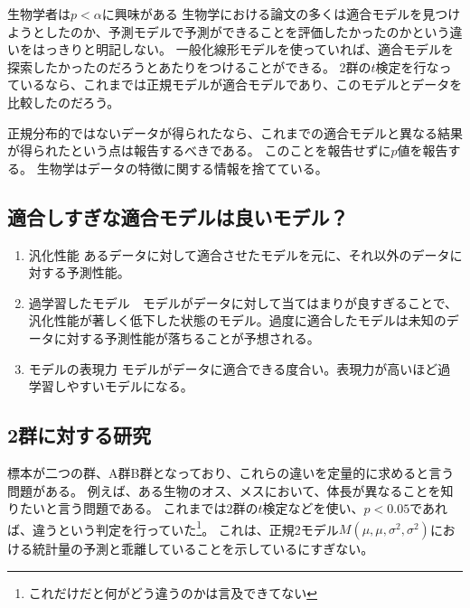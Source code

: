 \begin{SMbox}{生物学者は$p<\alpha$に興味がある}
    生物学における論文の多くは適合モデルを見つけようとしたのか、予測モデルで予測ができることを評価したかったのかという違いをはっきりと明記しない。
    一般化線形モデルを使っていれば、適合モデルを探索したかったのだろうとあたりをつけることができる。
    2群の$t$検定を行なっているなら、これまでは正規モデルが適合モデルであり、このモデルとデータを比較したのだろう。

    
    正規分布的ではないデータが得られたなら、これまでの適合モデルと異なる結果が得られたという点は報告するべきである。
    このことを報告せずに$p$値を報告する。
    生物学はデータの特徴に関する情報を捨てている。
\end{SMbox}

\subsection{適合しすぎな適合モデルは良いモデル？}%

\begin{enumerate}
    \item 汎化性能 あるデータに対して適合させたモデルを元に、それ以外のデータに対する予測性能。
    \item 過学習したモデル　モデルがデータに対して当てはまりが良すぎることで、汎化性能が著しく低下した状態のモデル。過度に適合したモデルは未知のデータに対する予測性能が落ちることが予想される。
    \item モデルの表現力 モデルがデータに適合できる度合い。表現力が高いほど過学習しやすいモデルになる。
\end{enumerate}




\subsection{2群に対する研究}
標本が二つの群、A群B群となっており、これらの違いを定量的に求めると言う問題がある。
例えば、ある生物のオス、メスにおいて、体長が異なることを知りたいと言う問題である。
これまでは2群の$t$検定などを使い、$p<0.05$であれば、違うという判定を行っていた\footnote{これだけだと何がどう違うのかは言及できてない}。
これは、正規2モデル$M(\mu,\mu,\sigma^2,\sigma^2)$における統計量の予測と乖離していることを示しているにすぎない。

